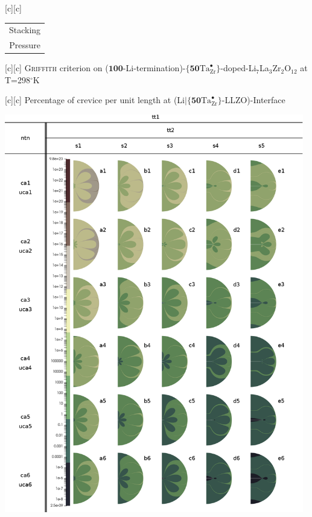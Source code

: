 [c][c] {\footnotesize \begin{tabular}{@{}c@{}} Stacking \\ Pressure \end{tabular}}

[c][c] {\footnotesize \textsc{Griffith} criterion on ($\textbf{100}$-Li-termination)-$\{\textbf{50}\text{Ta}^{\bullet}_{\text{Zr}}\}$-doped-Li$_{7}$La$_{3}$Zr$_{2}$O$_{12}$ at T=298$^{\circ}$K}

[c][c] {\footnotesize Percentage of crevice per unit length at (Li$|$$\{\textbf{50}\text{Ta}^{\bullet}_{\text{Zr}}\}$-LLZO)-Interface}

\includegraphics[width=0.98\textwidth]{contour_figs_Griffith_xx_Ta_pressure_crevice_298K_noframed.eps}